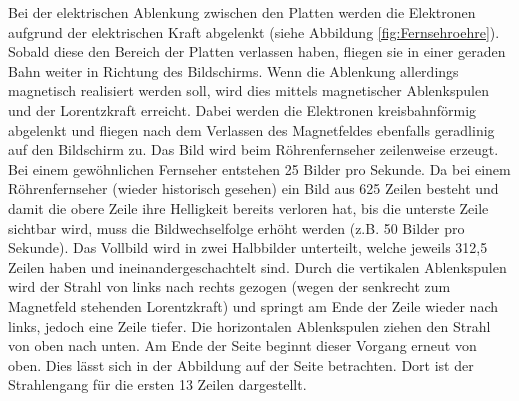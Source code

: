 Bei der elektrischen Ablenkung zwischen den Platten werden die Elektronen aufgrund der elektrischen Kraft abgelenkt (siehe Abbildung \ref{fig:Fernsehroehre}).
Sobald diese den Bereich der Platten verlassen haben, fliegen sie in einer geraden Bahn weiter in Richtung des Bildschirms.
Wenn die Ablenkung allerdings magnetisch realisiert werden soll, wird dies mittels magnetischer Ablenkspulen und der Lorentzkraft erreicht.
Dabei werden die Elektronen kreisbahnförmig abgelenkt und fliegen nach dem Verlassen des Magnetfeldes ebenfalls geradlinig auf den Bildschirm zu.
Das Bild wird beim Röhrenfernseher zeilenweise erzeugt.
Bei einem gewöhnlichen Fernseher entstehen 25 Bilder pro Sekunde.
Da bei einem Röhrenfernseher (wieder historisch gesehen) ein Bild aus 625 Zeilen besteht und damit die obere Zeile ihre Helligkeit bereits verloren hat, bis die unterste Zeile sichtbar wird, muss die Bildwechselfolge erhöht werden (z.B. 50 Bilder pro Sekunde).
Das Vollbild wird in zwei Halbbilder unterteilt, welche jeweils 312,5 Zeilen haben und ineinandergeschachtelt sind.
Durch die vertikalen Ablenkspulen wird der Strahl von links nach rechts gezogen (wegen der senkrecht zum Magnetfeld stehenden Lorentzkraft) und springt am Ende der Zeile wieder nach links, jedoch eine Zeile tiefer.
Die horizontalen Ablenkspulen ziehen den Strahl von oben nach  unten.
Am Ende der Seite beginnt dieser Vorgang erneut von oben.
Dies lässt sich in der Abbildung auf der Seite \cite{Roehrenfernsehr} betrachten.
Dort ist der Strahlengang für die ersten 13 Zeilen dargestellt.

